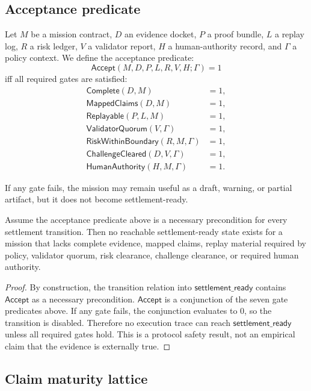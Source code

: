 \subsection{Acceptance predicate}

Let $M$ be a mission contract, $D$ an evidence docket, $P$ a proof bundle, $L$ a replay log, $R$ a risk ledger, $V$ a validator report, $H$ a human-authority record, and $\Gamma$ a policy context. We define the acceptance predicate:
\[
\mathsf{Accept}(M,D,P,L,R,V,H;\Gamma)=1
\]
iff all required gates are satisfied:
\begin{align*}
\mathsf{Complete}(D,M)&=1,\\
\mathsf{MappedClaims}(D,M)&=1,\\
\mathsf{Replayable}(P,L,M)&=1,\\
\mathsf{ValidatorQuorum}(V,\Gamma)&=1,\\
\mathsf{RiskWithinBoundary}(R,M,\Gamma)&=1,\\
\mathsf{ChallengeCleared}(D,V,\Gamma)&=1,\\
\mathsf{HumanAuthority}(H,M,\Gamma)&=1.
\end{align*}

If any gate fails, the mission may remain useful as a draft, warning, or partial artifact, but it does not become settlement-ready.

\begin{theorem}
Assume the acceptance predicate above is a necessary precondition for every settlement transition. Then no reachable settlement-ready state exists for a mission that lacks complete evidence, mapped claims, replay material required by policy, validator quorum, risk clearance, challenge clearance, or required human authority.
\end{theorem}

\begin{proof}
By construction, the transition relation into $\textsf{settlement\_ready}$ contains $\mathsf{Accept}$ as a necessary precondition. $\mathsf{Accept}$ is a conjunction of the seven gate predicates above. If any gate fails, the conjunction evaluates to $0$, so the transition is disabled. Therefore no execution trace can reach $\textsf{settlement\_ready}$ unless all required gates hold. This is a protocol safety result, not an empirical claim that the evidence is externally true.
\end{proof}

\subsection{Claim maturity lattice}

